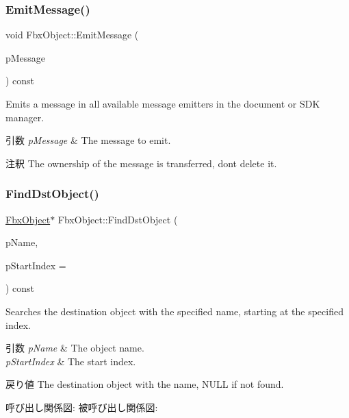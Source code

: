 \subsubsection{\texorpdfstring{Emit\+Message()}{EmitMessage()}}
{\footnotesize\ttfamily void Fbx\+Object\+::\+Emit\+Message (\begin{DoxyParamCaption}\item[{Fbx\+Message $\ast$}]{p\+Message }\end{DoxyParamCaption}) const}

Emits a message in all available message emitters in the document or S\+DK manager. 
\begin{DoxyParams}{引数}
{\em p\+Message} & The message to emit. \\
\hline
\end{DoxyParams}
\begin{DoxyRemark}{注釈}
The ownership of the message is transferred, don\textquotesingle{}t delete it. 
\end{DoxyRemark}
\mbox{\label{class_fbx_object_aebbe10e118482bb99048432fabd71194}} 
\subsubsection{\texorpdfstring{Find\+Dst\+Object()}{FindDstObject()}\hspace{0.1cm}{\footnotesize\ttfamily [1/4]}}
{\footnotesize\ttfamily \hyperlink{class_fbx_object}{Fbx\+Object}$\ast$ Fbx\+Object\+::\+Find\+Dst\+Object (\begin{DoxyParamCaption}\item[{const char $\ast$}]{p\+Name,  }\item[{int}]{p\+Start\+Index = {} }\end{DoxyParamCaption}) const}

Searches the destination object with the specified name, starting at the specified index. 
\begin{DoxyParams}{引数}
{\em p\+Name} & The object name. \\
\hline
{\em p\+Start\+Index} & The start index. \\
\hline
\end{DoxyParams}
\begin{DoxyReturn}{戻り値}
The destination object with the name, N\+U\+LL if not found. 
\end{DoxyReturn}
呼び出し関係図\+:
被呼び出し関係図\+:
\mbox{\label{class_fbx_object_a4f93119aca50aaa67a265763509e5eae}} 

